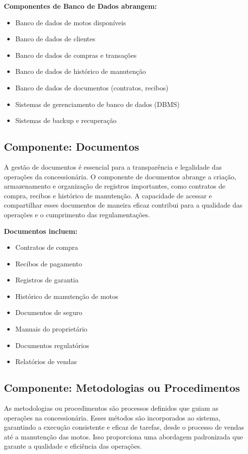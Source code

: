 	\textbf{Componentes de Banco de Dados abrangem:}
	
	\begin{itemize}
		\item Banco de dados de motos disponíveis
		\item Banco de dados de clientes
		\item Banco de dados de compras e transações
		\item Banco de dados de histórico de manutenção
		\item Banco de dados de documentos (contratos, recibos)
		\item Sistemas de gerenciamento de banco de dados (DBMS)
		\item Sistemas de backup e recuperação
	\end{itemize}


     \subsection{Componente: Documentos }
     A gestão de documentos é essencial para a transparência e legalidade das operações da concessionária. O componente de documentos abrange a criação, armazenamento e organização de registros importantes, como contratos de compra, recibos e histórico de manutenção. A capacidade de acessar e compartilhar esses documentos de maneira eficaz contribui para a qualidade das operações e o cumprimento das regulamentações.
     
	\textbf{Documentos incluem:}
	
	\begin{itemize}
		\item Contratos de compra
		\item Recibos de pagamento
		\item Registros de garantia
		\item Histórico de manutenção de motos
		\item Documentos de seguro
		\item Manuais do proprietário
		\item Documentos regulatórios
		\item Relatórios de vendas
	\end{itemize}


     \subsection{Componente: Metodologias ou Procedimentos}
     As metodologias ou procedimentos são processos definidos que guiam as operações na concessionária. Esses métodos são incorporados ao sistema, garantindo a execução consistente e eficaz de tarefas, desde o processo de vendas até a manutenção das motos. Isso proporciona uma abordagem padronizada que garante a qualidade e eficiência das operações.
     
